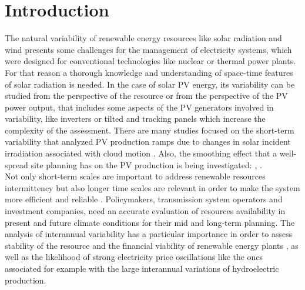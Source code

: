 \section{Introduction}



The natural variability of renewable energy resources like solar radiation and wind presents some challenges for the management of electricity systems, which were designed for conventional technologies like nuclear or thermal power plants. For that reason a thorough knowledge and understanding of space-time features of solar radiation is needed. In the case of solar PV energy,  its variability \cite*{Widen2015} can be studied from the perspective of the resource or from the perspective of the PV power output, that includes some aspects of the PV generators involved in variability, like inverters or tilted and tracking panels which increase the complexity of the assessment. There are many studies focused on the short-term variability \cite*{Zamo.Mestre.ea2014} that analyzed PV production ramps due to changes in solar incident irradiation associated with cloud motion \cite*{Cros2014, IEA-PVPS-T14-1.32015}. Also, the smoothing effect that a well-spread site planning has on the PV production is being investigated: \cite*{Marcos2012}, \cite*{Perpinan.Marcos.ea2013}.\\

Not only short-term scales are important to address renewable resources intermittency but also longer time scales are relevant in order to make the system more efficient and reliable \cite*{Davy2012}. Policymakers, transmission system operators and investment companies, need an accurate evaluation of resources availability in present and future climate conditions for their mid and long-term planning. The analysis of interannual variability has a particular importance in order to assess stability of the resource and the financial viability of renewable energy plants \cite*{pryor2006inter}, as well as the likelihood of strong electricity price oscillations like the ones associated for example with the large interannual variations of hydroelectric production.\\

